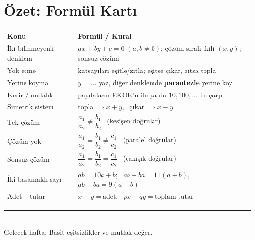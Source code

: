 \documentclass[11pt,a4paper]{article}
\newcounter{alis}
\newcommand{\ab}[1]{\overline{#1}}
\begin{document}
\section{Özet: Formül Kartı}
\begin{center}
\renewcommand{\arraystretch}{1.45}
\begin{tabular}{@{}lp{}@{}}
\toprule
Konu & Formül / Kural\\\midrule
İki bilinmeyenli denklem & \(ax+by+c=0\) \((a,b\neq 0)\); çözüm sıralı ikili \((x,y)\); sonsuz çözüm\\
Yok etme & katsayıları eşitle/zıtla; eşitse çıkar, zıtsa topla\\
Yerine koyma & \(y=\dots\) yaz, diğer denklemde \textbf{parantezle} yerine koy\\
Kesir / ondalık & paydaların EKOK'u ile ya da \(10,100,\dots\) ile çarp\\
Simetrik sistem & topla \(\Rightarrow x+y\), \ çıkar \(\Rightarrow x-y\)\\
Tek çözüm & \(\dfrac{a_1}{a_2}\neq\dfrac{b_1}{b_2}\) \ (kesişen doğrular)\\
Çözüm yok & \(\dfrac{a_1}{a_2}=\dfrac{b_1}{b_2}\neq\dfrac{c_1}{c_2}\) \ (paralel doğrular)\\
Sonsuz çözüm & \(\dfrac{a_1}{a_2}=\dfrac{b_1}{b_2}=\dfrac{c_1}{c_2}\) \ (çakışık doğrular)\\
İki basamaklı sayı & \(\ab{ab}=10a+b\); \ \(\ab{ab}+\ab{ba}=11(a+b)\), \ \(\ab{ab}-\ab{ba}=9(a-b)\)\\
Adet -- tutar & \(x+y=\text{adet}\), \ \(px+qy=\text{toplam tutar}\)\\\bottomrule
\end{tabular}
\end{center}



\vspace{6pt}
\noindent\textcolor{anamavi}{\rule{\textwidth}{0.5pt}}\\
{\small Gelecek hafta: Basit eşitsizlikler ve mutlak değer.}
\end{document}

